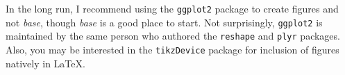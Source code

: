 In the long run, I recommend using the \texttt{ggplot2} package to
create figures and not \textit{base}, though \textit{base} is a good
place to start. Not surprisingly, \texttt{ggplot2} is maintained by
the same person who authored the \texttt{reshape} and \texttt{plyr}
packages. Also, you may be interested in the \texttt{tikzDevice}
package for inclusion of figures natively in \LaTeX{}.



